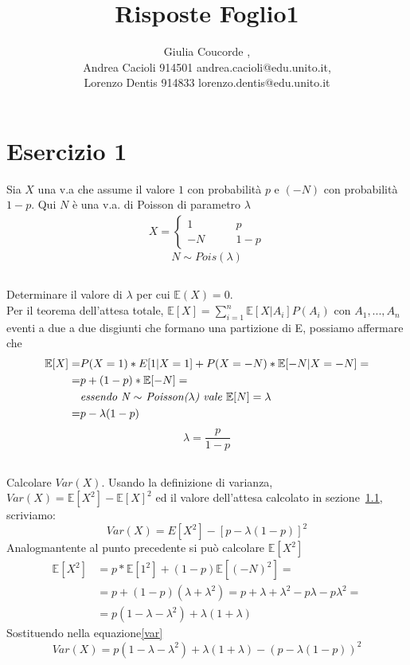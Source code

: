 \documentclass[a4paper]{article}
\newcommand{\E}[0]{\mathbb{E}}
\begin{document}
\author{Giulia Coucorde ,\\ Andrea Cacioli 914501 andrea.cacioli@edu.unito.it,\\ Lorenzo Dentis 914833 lorenzo.dentis@edu.unito.it}
\title{Risposte Foglio1}
\maketitle
\section{Esercizio 1}
Sia $X$ una v.a che assume il valore $1$ con probabilità $p$ e $(-N)$ con probabilità $1 - p$. Qui $N$ è una v.a. di Poisson di parametro $\lambda$
\begin{align}
	X=
	\begin{cases}
		1 \qquad & p\\
		-N \qquad & 1-p
	\end{cases}
\end{align}
$$N \sim Pois(\lambda)$$ 
\subsection{}
\label{SEC:1.a}
Determinare il valore di $\lambda$ per cui $\E(X) = 0$.\\
Per il teorema dell'attesa totale, $\E[X] = \sum_{i=1}^n\E[X|A_i]P(A_i)$ con $A_1, ..., A_n$ eventi a due a due disgiunti che formano una partizione di E, possiamo affermare che
\begin{align*}
	\E[X] = & P(X=1) * E[1 | X=1] + P(X=-N)*\E[-N | X= -N]=\\
	= & p + (1-p) * \E[-N]=\\
	  & \text{\textit{essendo N $\sim$ Poisson($\lambda$) vale $\E[N] = \lambda$}}\\
	= & p - \lambda(1-p) 
\end{align*}
$$\lambda = \frac{p}{1-p}$$
\subsection{}
Calcolare $Var(X)$.
Usando la definizione di varianza, $Var(X) = \E[X^2] - \E[X]^2$  ed il valore dell'attesa calcolato in sezione~\ref{SEC:1.a}, scriviamo:
\begin{equation}\label{var}Var(X) =  E[X^2] - [p - \lambda(1-p)]^2\end{equation} 
Analogmantente al punto precedente si può calcolare $\E[X^2]$
\begin{align*}
	\E[X^2] &= p* \E[1^2] + (1-p)\E[(-N)^2]=\\
		&= p + (1-p)(\lambda + \lambda^2)= p+\lambda +\lambda^2 -p\lambda - p\lambda^2 =\\
		&= p(1-\lambda -\lambda^2) + \lambda(1+\lambda) 
\end{align*}
Sostituendo nella equazione\eqref{var}
$$Var(X) =  p(1-\lambda -\lambda^2) + \lambda(1+\lambda) - (p - \lambda(1-p))^2 $$
\end{document}

